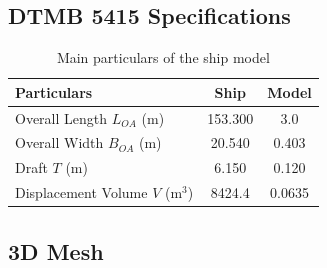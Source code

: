 \documentclass[12pt]{article} %
\begin{document}
\subsection{DTMB 5415 Specifications}
\begin{table}[h!]
    \centering
    \begin{tabular}{|l|c|c|}
        \hline
        \textbf{Particulars} & \textbf{Ship} & \textbf{Model} \\ \hline
        Overall Length $L_{OA}$ (m) & 153.300 & 3.0 \\ \hline
        Overall Width $B_{OA}$ (m) & 20.540 & 0.403 \\ \hline
        Draft $T$ (m) & 6.150 & 0.120 \\ \hline
        Displacement Volume $V$ (m$^3$) & 8424.4 & 0.0635 \\ \hline
        \end{tabular}
    \caption{Main particulars of the ship model}
\end{table}
\subsection{3D Mesh}
\end{document}
